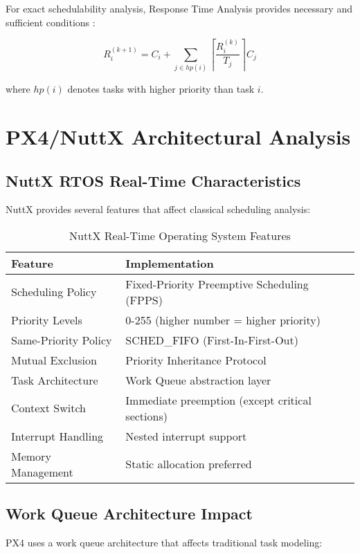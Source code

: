 \documentclass[12pt,a4paper]{article}
\begin{document}
For exact schedulability analysis, Response Time Analysis provides necessary and sufficient conditions \cite{audsley1993}:

\begin{equation}
R_i^{(k+1)} = C_i + \sum_{j \in hp(i)} \left\lceil \frac{R_i^{(k)}}{T_j} \right\rceil C_j
\end{equation}

where $hp(i)$ denotes tasks with higher priority than task $i$.

\section{PX4/NuttX Architectural Analysis}

\subsection{NuttX RTOS Real-Time Characteristics}

NuttX provides several features that affect classical scheduling analysis:

\begin{table}[H]
\centering
\caption{NuttX Real-Time Operating System Features}
\begin{tabular}{ll}
\toprule
\textbf{Feature} & \textbf{Implementation} \\
\midrule
Scheduling Policy & Fixed-Priority Preemptive Scheduling (FPPS) \\
Priority Levels & 0-255 (higher number = higher priority) \\
Same-Priority Policy & SCHED\_FIFO (First-In-First-Out) \\
Mutual Exclusion & Priority Inheritance Protocol \\
Task Architecture & Work Queue abstraction layer \\
Context Switch & Immediate preemption (except critical sections) \\
Interrupt Handling & Nested interrupt support \\
Memory Management & Static allocation preferred \\
\bottomrule
\end{tabular}
\end{table}

\subsection{Work Queue Architecture Impact}

PX4 uses a work queue architecture that affects traditional task modeling:
\end{document}
